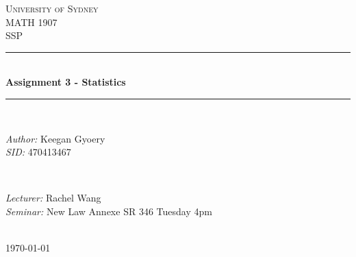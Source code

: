 \documentclass[a4paper]{article}
\begin{document}
\begin{titlepage}

\newcommand{\HRule}{\rule{\linewidth}{0.5mm}} %

\center %
 
\textsc{\LARGE University of Sydney}\\[1.5cm] %
\textsc{\Large MATH 1907}\\[0.5cm] %
\textsc{\large SSP}\\[0.5cm] %

\HRule \\[0.4cm]
{ \huge \bfseries Assignment 3 - Statistics}\\[0.4cm] %
\HRule \\[1.5cm]

\begin{minipage}{0.4\textwidth}
\begin{flushleft} \large
\emph{Author:}
Keegan Gyoery %
\\
\emph{SID:}
470413467
\end{flushleft}
\end{minipage}
~
\begin{minipage}{0.4\textwidth}
\begin{flushright} \large
\emph{Lecturer:} 
Rachel Wang %
\\
\emph{Seminar:}
New Law Annexe SR 346
Tuesday 4pm
\end{flushright}
\end{minipage}\\[4cm]

{\today}\\[3cm] %

\vfill %

\end{titlepage}

\end{document}
